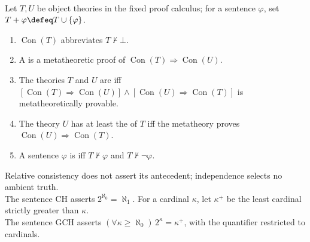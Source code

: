 \begin{definition} \label{def:relative-consistency-and-independence} \\
Let $T,U$ be object theories in the fixed proof calculus; for a sentence $\varphi$, set $T+\varphi\defeq T\cup\{\varphi\}$.
\begin{enumerate}[label=(\roman*)]
\setlength{\itemsep}{0pt}
\item $\operatorname{Con}(T)$ abbreviates $T\nvdash\bot$.
\item A  is a metatheoretic proof of $\operatorname{Con}(T)\Longrightarrow\operatorname{Con}(U)$.
\item The theories $T$ and $U$ are  iff $[\operatorname{Con}(T)\Longrightarrow\operatorname{Con}(U)]\land[\operatorname{Con}(U)\Longrightarrow\operatorname{Con}(T)]$ is metatheoretically provable.
\item The theory $U$ has at least the  of $T$ iff the metatheory proves $\operatorname{Con}(U)\Longrightarrow\operatorname{Con}(T)$.
\item A sentence $\varphi$ is  iff $T\nvdash\varphi$ and $T\nvdash\neg\varphi$.
\end{enumerate}
Relative consistency does not assert its antecedent; independence selects no ambient truth.\\
The sentence $\mathrm{CH}$ asserts $2^{\aleph_0}=\aleph_1$. For a cardinal $\kappa$, let $\kappa^+$ be the least cardinal strictly greater than $\kappa$.\\
The sentence $\mathrm{GCH}$ asserts $(\forall\kappa\geq\aleph_0)\,2^\kappa=\kappa^+$, with the quantifier restricted to cardinals.
\end{definition}

